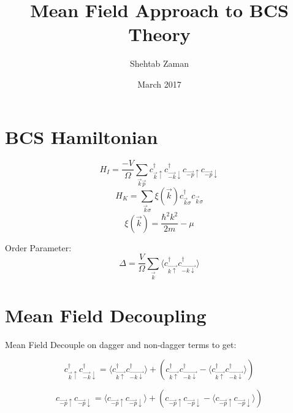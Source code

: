\documentclass{article}
\title{Mean Field Approach to BCS Theory}
\author{Shehtab Zaman }
\date{March 2017}
\begin{document}
\maketitle
\section{BCS Hamiltonian}

$$ H_I = \frac{-V}{\Omega} \sum_{\vec{k}\vec{p}}
  c^{\dagger}_{\vec{k}\uparrow}
    c^{\dagger}_{\vec{-k}\downarrow}
      c_{\vec{-p}\uparrow}
        c_{\vec{-p}\downarrow}$$
$$ H_K = \sum_{\vec{k}\sigma} \xi(\vec{k})
  c^{\dagger}_{\vec{k}\sigma}
    c_{\vec{k}\sigma}$$
$$ \xi(\vec{k}) = \frac{\hbar^2 k^2}{2m} - \mu$$

Order Parameter:
$$ \Delta = \frac{V}{\Omega}
  \sum_{\vec{k}}   \langle c^{\dagger}_{\vec{k \uparrow}} c^{\dagger}_{\vec{-k \downarrow}} \rangle $$
\section{Mean Field Decoupling}
Mean Field Decouple on dagger and non-dagger terms to get:

$$ c_{\vec{k}\uparrow}^{\dagger}c^{\dagger}_{\vec{-k}\downarrow} =
    \langle c^{\dagger}_{\vec{k \uparrow}} c^{\dagger}_{\vec{-k \downarrow}} \rangle
      + \left ( c^{\dagger}_{\vec{k \uparrow}} c^{\dagger}_{\vec{-k \downarrow}}
        - \langle c^{\dagger}_{\vec{k \uparrow}} c^{\dagger}_{\vec{-k \downarrow}}  \rangle \right)
$$

$$ c_{\vec{-p}\uparrow} c_{\vec{-p}\downarrow} =
    \langle c_{\vec{-p}\uparrow}c_{\vec{-p}\downarrow} \rangle
    + \left ( c_{\vec{-p}\uparrow}c_{\vec{-p}\downarrow}
    -  \langle c_{\vec{-p}\uparrow}c_{\vec{-p}\downarrow}  \rangle \right)
$$
\end{document}
